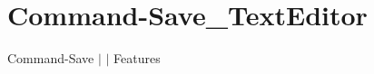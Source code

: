 \chapter{Command-\/\+Save\+\_\+\+Text\+Editor }
\hypertarget{md__docs_2_text_editor_2_features_2_command-_save___text_editor}{}\label{md__docs_2_text_editor_2_features_2_command-_save___text_editor}
Command-\/\+Save \texorpdfstring{$\vert$}{|}  \texorpdfstring{$\vert$}{|} Features



 